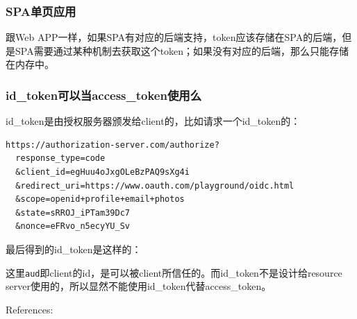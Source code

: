 \documentclass[12pt]{article}
\begin{document}
\subsubsection{SPA单页应用}\label{spaux5355ux9875ux5e94ux7528}

跟Web APP一样，如果SPA有对应的后端支持，token应该存储在SPA的后端，但是SPA需要通过某种机制去获取这个token；如果没有对应的后端，那么只能存储在内存中。

\subsubsection{id\_token可以当access\_token使用么}\label{id_tokenux53efux4ee5ux5f53access_tokenux4f7fux7528ux4e48}

id\_token是由授权服务器颁发给client的，比如请求一个id\_token的：

\begin{verbatim}
https://authorization-server.com/authorize?
  response_type=code
  &client_id=egHuu4oJxgOLeBzPAQ9sXg4i
  &redirect_uri=https://www.oauth.com/playground/oidc.html
  &scope=openid+profile+email+photos
  &state=sRROJ_iPTam39Dc7
  &nonce=eFRvo_n5ecyYU_Sv
\end{verbatim}

最后得到的id\_token是这样的：

\begin{Shaded}
\begin{Highlighting}[]
\FunctionTok{\{}
  \FunctionTok{:} \FunctionTok{,}
  \FunctionTok{:} \FunctionTok{,}
  \FunctionTok{:} \FunctionTok{,}
  \FunctionTok{:} \FunctionTok{,}
  \FunctionTok{:} \FunctionTok{,}
  \FunctionTok{:} \FunctionTok{,}
  \FunctionTok{:} \FunctionTok{,}
  \FunctionTok{:} \OtherTok{[}
  \OtherTok{]}
\FunctionTok{\}}
\end{Highlighting}
\end{Shaded}

这里\texttt{aud}即client的id，是可以被client所信任的。而id\_token不是设计给resource server使用的，所以显然不能使用id\_token代替access\_token。

References:
\end{document}
